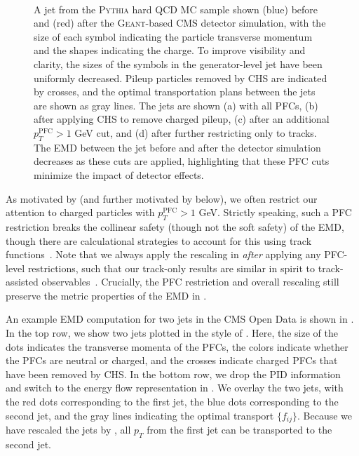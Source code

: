 \documentclass[aps,prd,twocolumn,preprintnumbers,nofootinbib,longbibliography,floatfix,superscriptaddress]{revtex4-1}
\begin{document}
\begin{figure*}
  \\
  \caption{
A jet from the \textsc{Pythia} hard QCD MC sample shown (blue) before and (red) after the \textsc{Geant}-based CMS detector simulation, with the size of each symbol indicating the particle transverse momentum and the shapes indicating the charge.
%
To improve visibility and clarity, the sizes of the symbols in the generator-level jet have been uniformly decreased.
%
Pileup particles removed by CHS are indicated by crosses, and the optimal transportation plans between the jets are shown as gray lines.
%
The jets are shown (a) with all PFCs, (b) after applying CHS to remove charged pileup, (c) after an additional $p_T^\text{PFC}>1$ GeV cut, and (d) after further restricting only to tracks.
%
The EMD between the jet before and after the detector simulation decreases as these cuts are applied, highlighting that these PFC cuts minimize the impact of detector effects.
    \label{fig:SIMGENexample}
}
\end{figure*}


As motivated by  (and further motivated by  below), we often restrict our attention to charged particles with $p_T^\text{PFC}>1$ GeV.
%
Strictly speaking, such a PFC restriction breaks the collinear safety (though not the soft safety) of the EMD, though there are calculational strategies to account for this using track functions~\cite{Waalewijn:2012sv,Krohn:2012fg,Chang:2013rca,Chang:2013iba}.
%
Note that we always apply the rescaling in  \emph{after} applying any PFC-level restrictions, such that our track-only results are similar in spirit to track-assisted observables~\cite{ATLAS:2016vmy,Elder:2018mcr}.
%
Crucially, the PFC restriction and overall rescaling still preserve the metric properties of the EMD in .


An example EMD computation for two jets in the CMS Open Data is shown in .
%
In the top row, we show two jets plotted in the style of .
%
Here, the size of the dots indicates the transverse momenta of the PFCs, the colors indicate whether the PFCs are neutral or charged, and the crosses indicate charged PFCs that have been removed by CHS.
%
In the bottom row, we drop the PID information and switch to the energy flow representation in .
%
We overlay the two jets, with the red dots corresponding to the first jet, the blue dots corresponding to the second jet, and the gray lines indicating the optimal transport $\{f_{ij}\}$.
%
Because we have rescaled the jets by , all $p_T$ from the first jet can be transported to the second jet.
\end{document}
